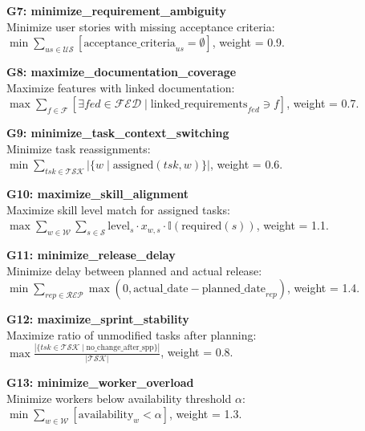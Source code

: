 \documentclass[12pt]{article}
\begin{document}
    \item \textbf{G7: minimize\_requirement\_ambiguity} \\
    Minimize user stories with missing acceptance criteria: \\
    $\min \sum_{us \in \mathcal{US}} \left[ \text{acceptance\_criteria}_{us} = \emptyset \right]$, weight = 0.9.

    \item \textbf{G8: maximize\_documentation\_coverage} \\
    Maximize features with linked documentation: \\
    $\max \sum_{f \in \mathcal{F}} \left[ \exists fed \in \mathcal{FED} \mid \text{linked\_requirements}_{fed} \ni f \right]$, weight = 0.7.

    \item \textbf{G9: minimize\_task\_context\_switching} \\
    Minimize task reassignments: \\
    $\min \sum_{tsk \in \mathcal{TSK}} \left| \{ w \mid \text{assigned}(tsk, w) \} \right|$, weight = 0.6.

    \item \textbf{G10: maximize\_skill\_alignment} \\
    Maximize skill level match for assigned tasks: \\
    $\max \sum_{w \in \mathcal{W}} \sum_{s \in \mathcal{S}} \text{level}_s \cdot x_{w,s} \cdot \mathbb{I}(\text{required}(s))$, weight = 1.1.

    \item \textbf{G11: minimize\_release\_delay} \\
    Minimize delay between planned and actual release: \\
    $\min \sum_{rep \in \mathcal{REP}} \max(0, \text{actual\_date} - \text{planned\_date}_{rep})$, weight = 1.4.

    \item \textbf{G12: maximize\_sprint\_stability} \\
    Maximize ratio of unmodified tasks after planning: \\
    $\max \frac{|\{ tsk \in \mathcal{TSK} \mid \text{no\_change\_after\_spp} \}|}{|\mathcal{TSK}|}$, weight = 0.8.

    \item \textbf{G13: minimize\_worker\_overload} \\
    Minimize workers below availability threshold $\alpha$: \\
    $\min \sum_{w \in \mathcal{W}} \left[ \text{availability}_w < \alpha \right]$, weight = 1.3.
\end{document}
